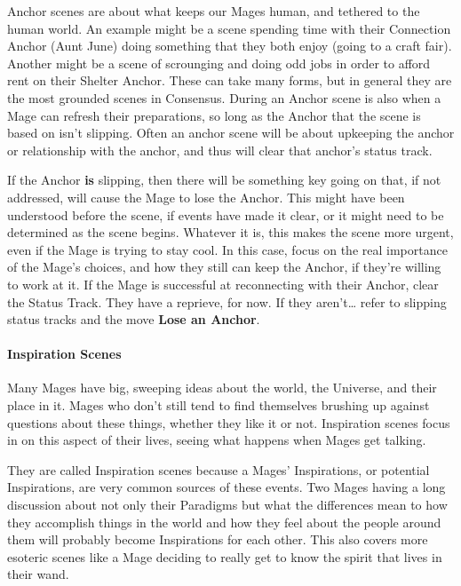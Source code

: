 \documentclass[
]{article}
\begin{document}
Anchor scenes are about what keeps our Mages human, and tethered to the
human world. An example might be a scene spending time with their
Connection Anchor (Aunt June) doing something that they both enjoy
(going to a craft fair). Another might be a scene of scrounging and
doing odd jobs in order to afford rent on their Shelter Anchor. These
can take many forms, but in general they are the most grounded scenes in
Consensus. During an Anchor scene is also when a Mage can refresh their
preparations, so long as the Anchor that the scene is based on isn't
slipping. Often an anchor scene will be about upkeeping the anchor or
relationship with the anchor, and thus will clear that anchor's status
track.

If the Anchor \textbf{is} slipping, then there will be something key
going on that, if not addressed, will cause the Mage to lose the Anchor.
This might have been understood before the scene, if events have made it
clear, or it might need to be determined as the scene begins. Whatever
it is, this makes the scene more urgent, even if the Mage is trying to
stay cool. In this case, focus on the real importance of the Mage's
choices, and how they still can keep the Anchor, if they're willing to
work at it. If the Mage is successful at reconnecting with their Anchor,
clear the Status Track. They have a reprieve, for now. If they
aren't\ldots{} refer to slipping status tracks and the move \textbf{Lose
an Anchor}.

\hypertarget{inspiration-scenes}{%
\paragraph{Inspiration Scenes}\label{inspiration-scenes}}

Many Mages have big, sweeping ideas about the world, the Universe, and
their place in it. Mages who don't still tend to find themselves
brushing up against questions about these things, whether they like it
or not. Inspiration scenes focus in on this aspect of their lives,
seeing what happens when Mages get talking.

They are called Inspiration scenes because a Mages' Inspirations, or
potential Inspirations, are very common sources of these events. Two
Mages having a long discussion about not only their Paradigms but what
the differences mean to how they accomplish things in the world and how
they feel about the people around them will probably become Inspirations
for each other. This also covers more esoteric scenes like a Mage
deciding to really get to know the spirit that lives in their wand.
\end{document}
